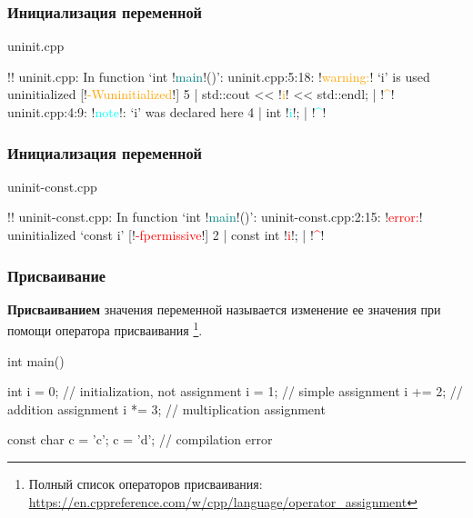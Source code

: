 \documentclass[compress, 8pt, aspectratio=169]{beamer}
\begin{document}
\begin{frame}[fragile]

    \frametitle{Инициализация переменной}

        {uninit.cpp}

    \begin{terminalwindow}
        !!
uninit.cpp: In function ‘int !\textcolor{teal}{main}!()’:
uninit.cpp:5:18: !\textcolor{orange}{warning:}! ‘i’ is used uninitialized [!\textcolor{orange}{-Wuninitialized}!]
    5 |     std::cout << !\textcolor{orange}{i}! << std::endl;
      |                  !\textcolor{orange}{\^{}}!
uninit.cpp:4:9: !\textcolor{cyan}{note}!: ‘i’ was declared here
    4 |     int !\textcolor{cyan}{i}!;
      |         !\textcolor{cyan}{\^{}}!
    \end{terminalwindow}

\end{frame}

\begin{frame}[fragile]

    \frametitle{Инициализация переменной}

        {uninit-const.cpp}

    \begin{terminalwindow}
!!
uninit-const.cpp: In function ‘int !\textcolor{teal}{main}!()’:
uninit-const.cpp:2:15: !\textcolor{red}{error:}! uninitialized ‘const i’ [!\textcolor{red}{-fpermissive}!]
    2 |     const int !\textcolor{red}{i}!;
      |               !\textcolor{red}{\^{}}!
    \end{terminalwindow}

\end{frame}

\begin{frame}[fragile]

    \frametitle{Присваивание}

    \textbf{Присваиванием} значения переменной называется изменение ее
        значения при помощи оператора присваивания
        \footnote{Полный список операторов присваивания:
            \url{https://en.cppreference.com/w/cpp/language/operator\_assignment}}.

    \begin{myinplacelisting}[minted language=cpp]
int main() {
    int i = 0;  // initialization, not assignment
    i = 1;      // simple assignment
    i += 2;     // addition assignment
    i *= 3;     // multiplication assignment

    const char c = 'c';
    c = 'd';    // compilation error
}
    \end{myinplacelisting}

\end{frame}
\end{document}
